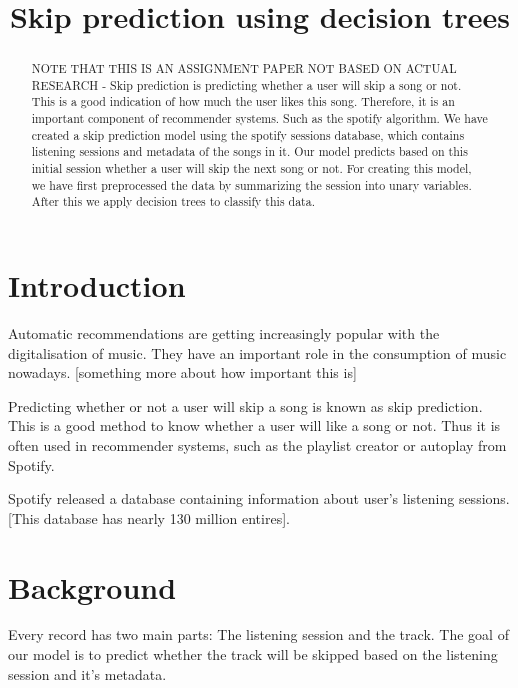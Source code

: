 \documentclass[conference]{IEEEtran}
\begin{document}
\title{Skip prediction using decision trees\\}

\author{
}

\maketitle

\begin{abstract}
	NOTE THAT THIS IS AN ASSIGNMENT PAPER NOT BASED ON ACTUAL RESEARCH - 
	Skip prediction is predicting whether a user will skip a song or not. 
	This is a good indication of how much the user likes this song.
	Therefore, it is an important component of recommender systems. Such as the spotify algorithm. 
	We have created a skip prediction model using the spotify sessions database, 
	which contains listening sessions and metadata of the songs in it. 
	Our model predicts based on this initial session whether a user will skip the next song or not.
	For creating this model, we have first preprocessed the data by summarizing the session into unary variables. 
	After this we apply decision trees to classify this data.
\end{abstract}

\section{Introduction}
Automatic recommendations are getting increasingly popular with the digitalisation of music. They have an important role in the consumption of music nowadays. [something more about how important this is]

Predicting whether or not a user will skip a song is known as skip prediction. 
This is a good method to know whether a user will like a song or not. 
Thus it is often used in recommender systems, 
such as the playlist creator or autoplay from Spotify. 

Spotify released a database containing information about user's listening sessions. 
[This database has nearly 130 million entires]. 

\section{Background}
Every record has two main parts: The listening session and the track. 
The goal of our model is to predict whether the track will be skipped based on the listening session and it's metadata.
\end{document}
